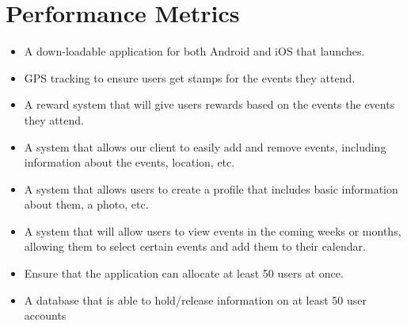 \documentclass[onecolumn, draftclsnofoot,10pt, compsoc]{IEEEtran}
\begin{document}
\section{Performance Metrics}
\begin{itemize}
    \item A down-loadable application for  both Android and iOS that launches.
    \item GPS tracking to ensure users get stamps for the events they attend.
    \item A reward system that will give users rewards based on the events the events they attend.
    \item A system that allows our client to easily add and remove events, including information about the events, location, etc.
    \item A system that allows users to create a profile that includes basic information about them, a photo, etc.
    \item A system that will allow users to view events in the coming weeks or months, allowing them to select certain events and add them to their calendar.
    \item Ensure that the application can allocate at least 50 users at once.
    \item A database that is able to hold/release information on at least 50 user accounts
\end{itemize}
\end{document}
